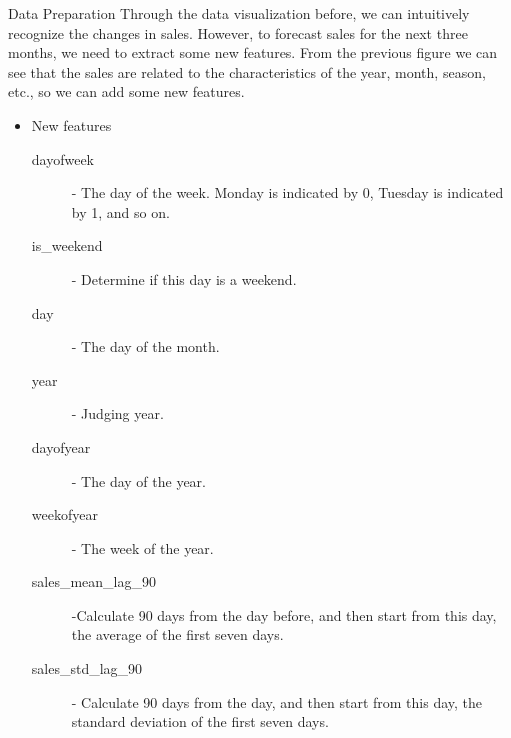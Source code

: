 \documentclass[
 size=12pt,
 paper=smartboard, %
 mode=present, %
 display=slides, %
style=tuliplab,
pauseslide,
fleqn,leqno]{powerdot}
\begin{document}
\begin{slide}{Data Preparation}
  Through the data visualization before, we can intuitively recognize the changes in sales. However, to forecast sales for the 
  next three months, we need to extract some new features. From the previous figure we can see that the sales are related to the
  characteristics of the year, month, season, etc., so we can add some new features.

\begin{itemize}
  \item New features
  \ 
  \begin{description}
    \item[dayofweek]- The day of the week. Monday is indicated by 0, Tuesday is indicated by 1, and so on.
    \item[is_weekend]-  Determine if this day is a weekend. 
    \item[day]- The day of the month.
    \item[year]- Judging year. 
    \item[dayofyear]- The day of the year.
    \item[weekofyear] - The week of the year.
    \item[sales_mean_lag_90]-Calculate 90 days from the day before, and then start from this day, the average of the first seven days.
    \item[sales_std_lag_90]-  Calculate 90 days from the day, and then start from this day, the standard deviation of the first seven days. 
  \end{description} 
\end{itemize}
\end{slide}
\end{document}
